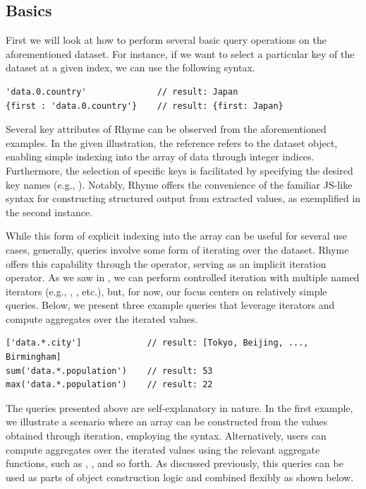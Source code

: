 \documentclass[runningheads]{llncs}
\newcommand{\lang}{Rhyme}
\begin{document}
\subsection{Basics}
First we will look at how to perform several basic query operations on the
aforementioned dataset.
For instance, if we want to select a particular key of the dataset at a given
index, we can use the following syntax.

\begin{lstlisting}[style=JavaScript]
'data.0.country'              // result: Japan
{first : 'data.0.country'}    // result: {first: Japan}
\end{lstlisting}

Several key attributes of \lang{} can be observed from the aforementioned examples.
In the given illustration, the reference  refers to
the dataset object, enabling simple indexing into the array of data through integer
indices.
Furthermore, the selection of specific keys is facilitated by specifying the desired
key names (e.g., ).
Notably, \lang{} offers the convenience of the familiar JS-like syntax for constructing
structured output from extracted values, as exemplified in the second instance.

While this form of explicit indexing into the array can be useful for several
use cases, generally, queries involve some form of iterating over the dataset.
\lang{} offers this capability through the \inline{*} operator,
serving as an implicit iteration operator.
As we saw in , we can perform controlled iteration with multiple
named iterators (e.g., , , etc.), but,
for now, our focus centers on relatively simple queries.
Below, we present three example queries that leverage iterators and compute
aggregates over the iterated values.

\begin{lstlisting}[style=JavaScript, columns=flexible]
['data.*.city']             // result: [Tokyo, Beijing, ..., Birmingham]
sum('data.*.population')    // result: 53
max('data.*.population')    // result: 22
\end{lstlisting}

The queries presented above are self-explanatory in nature.
In the first example, we illustrate a scenario where an array can be constructed
from the values obtained through iteration, employing the \inline{[...]} syntax.
Alternatively, users can compute aggregates over the iterated values using the
relevant aggregate functions, such as , , and so forth.
As discussed previously, this queries can be used as parts of object
construction logic and combined flexibly as shown below.
\end{document}
